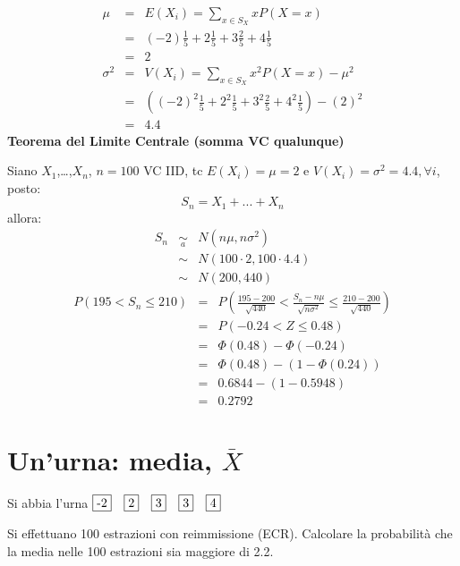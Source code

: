 \documentclass[
  11pt,
]{book}
\theoremstyle{mytheoremstyle}
\theoremstyle{mydefstyle}
\newenvironment{sol}
  {
  \begin{tcolorbox}[enhanced,breakable,arc=0.1mm,boxrule=1pt,colback=white,colframe=iblue,
  title=\bf \fontfamily{lmss}\selectfont \hspace{.5 cm} Soluzione,drop fuzzy shadow]

}{
\end{tcolorbox}
  }
\begin{document}
\begin{sol}
\begin{eqnarray*} \mu &=& E(X_i) = \sum_{x\in S_X}x P(X=x)\\ 
 &=& ( -2 ) \frac { 1 }{ 5 }+ 2  \frac { 1 }{ 5 }+ 3  \frac { 2 }{ 5 }+ 4  \frac { 1 }{ 5 } \\ 
            &=& 2 \\ 
 \sigma^2 &=& V(X_i) = \sum_{x\in S_X}x^2 P(X=x)-\mu^2\\ 
 &=&\left( ( -2 ) ^2\frac { 1 }{ 5 }+ 2  ^2\frac { 1 }{ 5 }+ 3  ^2\frac { 2 }{ 5 }+ 4  ^2\frac { 1 }{ 5 } \right)-( 2 )^2\\ 
            &=& 4.4 
\end{eqnarray*}
\textbf{Teorema del Limite Centrale (somma VC qualunque)}

Siano \(X_1\),\ldots,\(X_n\), \(n=100\) VC IID, tc \(E(X_i)=\mu=2\) e \(V(X_i)=\sigma^2=4.4,\forall i\), posto:
\[
      S_n = X_1 + ... + X_n
      \]
allora:\begin{eqnarray*}
  S_n & \mathop{\sim}\limits_{a}& N(n\mu,n\sigma^2) \\
     &\sim & N(100\cdot2,100\cdot4.4) \\
     &\sim & N(200,440) 
  \end{eqnarray*}\begin{eqnarray*}
   P( 195 < S_n \leq  210 ) &=& P\left( \frac { 195  -  200 }{\sqrt{ 440 }} < \frac { S_n  -  n\mu }{ \sqrt{n\sigma^2} } \leq \frac { 210  -  200 }{\sqrt{ 440 }}\right)  \\
              &=& P\left(  -0.24  < Z \leq  0.48 \right) \\
              &=& \Phi( 0.48 )-\Phi( -0.24 )\\
              &=&  \Phi( 0.48 )-(1-\Phi( 0.24 )) \\ &=&  0.6844 -(1- 0.5948 ) \\ 
              &=&  0.2792 
   \end{eqnarray*}

\end{sol}

\section{\texorpdfstring{Un'urna: media, \(\bar{X}\)}{Un'urna: media, \textbackslash bar\{X\}}}\label{unurna-media-barx}

Si abbia l'urna \(\fbox{-2}\quad \fbox{2}\quad \fbox{3}\quad \fbox{3}\quad \fbox{4}\)

Si effettuano 100 estrazioni con reimmissione (ECR). Calcolare la
probabilità che la media nelle 100 estrazioni sia maggiore di 2.2.
\end{document}
